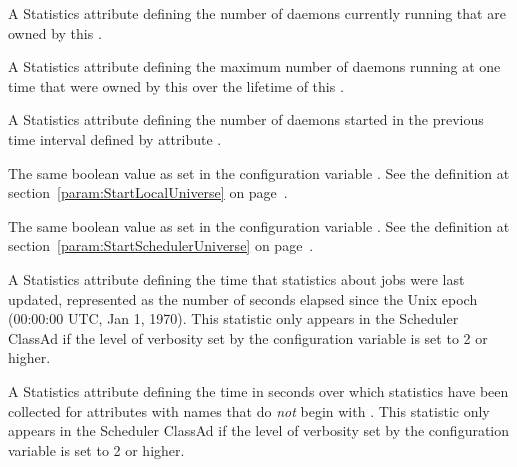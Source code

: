 \begin{description}
\item[\AdAttr{ShadowsRunning}:] A Statistics attribute defining
  the number of  daemons currently running 
  that are owned by this .

\item[\AdAttr{ShadowsRunningPeak}:] A Statistics attribute defining
  the maximum number of  daemons running at one time
  that were owned by this  over the lifetime of 
  this .

\item[\AdAttr{ShadowsStarted}:] A Statistics attribute defining
  the number of  daemons started
  in the previous time interval defined by attribute .

\item[\AdAttr{StartLocalUniverse}:] The same boolean value as set in the
  configuration variable .
  See the definition at section~\ref{param:StartLocalUniverse} on
  page~\pageref{param:StartLocalUniverse}.

\item[\AdAttr{StartSchedulerUniverse}:] The same boolean value as set in the
  configuration variable .
  See the definition at section~\ref{param:StartSchedulerUniverse} on
  page~\pageref{param:StartSchedulerUniverse}.

\item[\AdAttr{StatsLastUpdateTime}:] A Statistics attribute defining
  the time that statistics about jobs were last updated,
  represented as the number of seconds elapsed since
  the Unix epoch (00:00:00 UTC, Jan 1, 1970).
  This statistic only appears in the Scheduler ClassAd if the level of
  verbosity set by the configuration variable 
  is set to 2 or higher.

\item[\AdAttr{StatsLifetime}:] A Statistics attribute defining
  the time in seconds over which statistics have been collected
  for attributes with names that do \emph{not} begin with .
  This statistic only appears in the Scheduler ClassAd if the level of
  verbosity set by the configuration variable 
  is set to 2 or higher.


\end{description}
